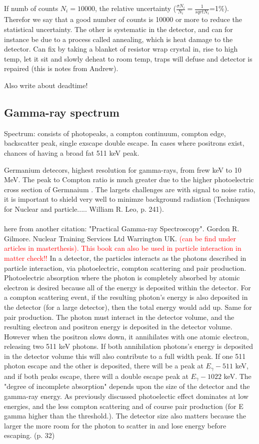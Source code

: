 \documentclass[a4paper,11pt,twoside]{book}
\begin{document}
If numb of counts $N_i =10000$, the relative uncertainty ($\frac{\sigma N_i }{N_i}= \frac{1}{{sqrt{N_i}}}$=1\%). Therefor we say that a good number of counts is 10000 or more to reduce the statistical uncertainty. The other is systematic in the detector, and can for instance be due to a process called annealing, which is heat damage to the detector. Can fix by taking a blanket of resistor wrap crystal in, rise to high temp, let it sit and slowly deheat to room temp, traps will defuse and detector is repaired (this is notes from Andrew).

Also write about deadtime! 
\subsection{Gamma-ray spectrum}

Spectrum: consists of photopeaks, a compton continuum, compton edge, backscatter peak, single exscape double escape. In cases where positrons exist, chances of having a broad fat 511 keV peak. 

Germanium detecors, highest resolution for gamma-rays, from frew keV to 10 MeV. The peak to Compton ratio is much greater due to the higher photoelectric cross section of Germnaium . The largets challenges are with signal to noise ratio, it is important to shield very well to minimze background radiation (Techniques for Nuclear and particle..... William R. Leo, p. 241). \\ \\

\noindent 
here from another citation: "Practical Gamma-ray Spectroscopy". Gordon R. Gilmore. Nuclear Training Services Ltd Warrington UK. \textcolor{red}{(can be find under articles in masterthesis). This book can also be used in particle interaction in matter check!!}
In a detector, the particles interacts as the photons described in particle interaction, via photoelectric, compton scattering and pair production. Photoelectric absorption where the photon is completely absorbed by atomic electron is desired because all of the energy is deposited within the detector. For a compton scattering event, if the resulting photon's energy is also deposited in the detector (for a large detector), then the total energy would add up. Same for pair production. The photon must interact in the detector volume, and the resulting electron and positron energy is deposited in the detector volume. However when the positron slows down, it annihilates with one atomic electron, releasing two 511 keV photons. If both annihilation photons's energy is deposited in the detector volume this will also contribute to a full width peak. If one 511 photon escape and the other is deposited, there will be a peak at $E_\gamma-511$ keV, and if both peaks escape, there will a double escape peak at $E_\gamma-1022$ keV. The "degree of incomplete absorption" depends upon the size of the detector and the gamma-ray energy. As previously discussed photoelectic effect dominates at low energies, and the less compton scattering and of course pair production (for E gamma higher than the threshold.). The detector size also matters because the larger the more room for the photon to scatter in and lose energy before escaping. (p. 32) \\
\end{document}
